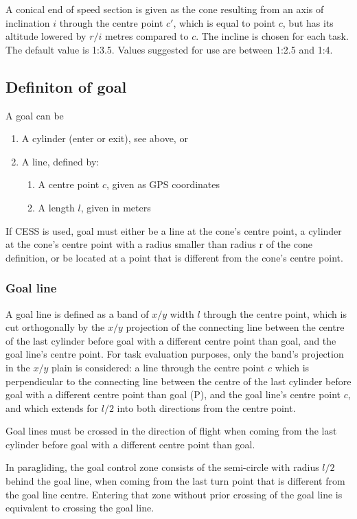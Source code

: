 \documentclass{article}
\begin{document}
A conical end of speed section is given as the cone resulting from an axis of
inclination \(i\) through the centre point \(c'\), which is equal to point
\(c\), but has its altitude lowered by \(r/i\) metres compared to \(c\).  The
incline is chosen for each task. The default value is 1:3.5. Values suggested
for use are between
1:2.5 and 1:4.

\subsection{Definiton of goal}
A goal can be
\begin{enumerate}
    \item A cylinder (enter or exit), see above, or
    \item A line, defined by:
    \begin{enumerate}
        \item A centre point \(c\), given as GPS coordinates
        \item A length \(l\), given in meters
    \end{enumerate}
\end{enumerate}

If CESS is used, goal must either be a line at the cone’s centre point,
a cylinder at the cone’s centre point with a radius smaller than radius r of
the cone definition, or be located at a point that is different from the cone’s
centre point.

\subsubsection{Goal line}
A goal line is defined as a band of \(x/y\) width \(l\) through the centre
point, which is cut orthogonally by the \(x/y\) projection of the connecting
line between the centre of the last cylinder before goal with a different
centre point than goal, and the goal line’s centre point. For task evaluation
purposes, only the band’s projection in the \(x/y\) plain is considered: a line
through the centre point \(c\) which is perpendicular to the connecting line
between the centre of the last cylinder before goal with a different centre
point than goal (P), and the goal line’s centre point \(c\), and which extends
for \(l/2\) into both directions from the centre point.

Goal lines must be crossed in the direction of flight when coming from the last
cylinder before goal with a different centre point than goal.

In paragliding, the goal control zone consists of the semi-circle with radius
\(l/2\) behind the goal line, when coming from the last turn point that is
different from the goal line centre. Entering that zone without prior crossing
of the goal line is equivalent to crossing the goal line.
\end{document}
